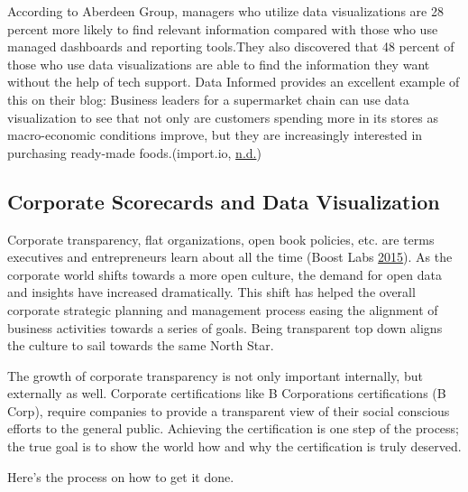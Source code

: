 \documentclass[]{book}
\begin{document}
According to Aberdeen Group, managers who utilize data visualizations are 28 percent more likely to find relevant information compared with those who use managed dashboards and reporting tools.They also discovered that 48 percent of those who use data visualizations are able to find the information they want without the help of tech support.
Data Informed provides an excellent example of this on their blog:
Business leaders for a supermarket chain can use data visualization to see that not only are customers spending more in its stores as macro-economic conditions improve, but they are increasingly interested in purchasing ready-made foods.(import.io, \protect\hyperlink{ref-import.io}{n.d.})

\hypertarget{corporate-scorecards-and-data-visualization}{%
\subsection{Corporate Scorecards and Data Visualization}\label{corporate-scorecards-and-data-visualization}}

Corporate transparency, flat organizations, open book policies, etc. are terms executives and entrepreneurs learn about all the time (Boost Labs \protect\hyperlink{ref-SCORECARDS}{2015}). As the corporate world shifts towards a more open culture, the demand for open data and insights have increased dramatically. This shift has helped the overall corporate strategic planning and management process easing the alignment of business activities towards a series of goals. Being transparent top down aligns the culture to sail towards the same North Star.

The growth of corporate transparency is not only important internally, but externally as well. Corporate certifications like B Corporations certifications (B Corp), require companies to provide a transparent view of their social conscious efforts to the general public. Achieving the certification is one step of the process; the true goal is to show the world how and why the certification is truly deserved.

Here's the process on how to get it done.
\end{document}

